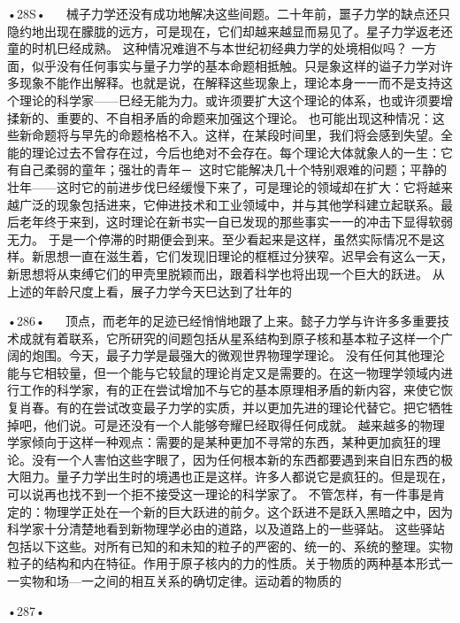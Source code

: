 •28S•
  
械子力学还没有成功地解决这些间题。二十年前，噩子力学的缺点还只隐约地出现在朦胧的远方，可是现在，它们却越来越显而易见了。星子力学返老还童的时机巳经成熟。
这种情况难逍不与本世纪初经典力学的处境相似吗？
一方面，似乎没有任何事实与量子力学的基本命题相抵触。只是象这样的谥子力学对许多现象不能作出解释。也就是说，在解释这些现象上，理论本身一一而不是支持这个理论的科学家——巳经无能为力。或许须要扩大这个理论的体系，也或许须要增揉新的、重要的、不自相矛盾的命题来加强这个理论。
也可能出现这种情况：这些新命题将与早先的命题格格不入。这样，在某段时间里，我们将会感到失望。全能的理论过去不曾存在过，今后也绝对不会存在。每个理论大体就象人的一生：它有自己柔弱的童年；强壮的青年－~这时它能解决几十个特别艰难的问题；平静的壮年——这时它的前进步伐巳经缓慢下来了，可是理论的领域却在扩大：它将越来越广泛的现象包括进来，它伸进技术和工业领域中，并与其他学科建立起联系。最后老年终于来到，这时理论在新书实一自已发现的那些事实一一的冲击下显得软弱无力。
于是一个停滞的时期便会到来。至少看起来是这样，虽然实际情况不是这样。新思想一直在滋生着，它们发现旧理论的框框过分狭窄。迟早会有这么一天，新思想将从束缚它们的甲壳里脱颖而出，跟着科学也将出现一个巨大的跃进。
从上述的年龄尺度上看，展子力学今天巳达到了壮年的

•286•
  
顶点，而老年的足迹已经悄悄地跟了上来。懿子力学与许许多多重要技术成就有着联系，它所研究的间题包括从星系结构到原子核和基本粒子这样一个广阔的炮围。今天，最子力学是最强大的微观世界物理学理论。
没有任何其他理沦能与它相较量，但一个能与它较鼠的理论肖定又是需要的。在这一物理学领域内进行工作的科学家，有的正在尝试增加不与它的基本原理相矛盾的新内容，来使它恢复肖春。有的在尝试改变最子力学的实质，并以更加先进的理论代替它。把它牺牲掉吧，他们说。可是还没有一个人能够夸耀巳经取得任何成就。
越来越多的物理学家倾向于这样一种观点：需要的是某种更加不寻常的东西，某种更加疯狂的理论。没有一个人害怕这些字眼了，因为任何根本新的东西都要遇到来自旧东西的极大阻力。量子力学出生时的境遇也正是这样。许多人都说它是疯狂的。但是现在，可以说再也找不到一个拒不接受这一理论的科学家了。
不管怎样，有一件事是肯定的：物理学正处在一个新的巨大跃进的前夕。这个跃进不是跃入黑暗之中，因为科学家十分清楚地看到新物理学必由的道路，以及道路上的一些驿站。
这些驿站包括以下这些。对所有已知的和未知的粒子的严密的、统一的、系统的整理。实物粒子的结构和内在特征。作用于原子核内的力的性质。关于物质的两种基本形式一一实物和场—一之间的相互关系的确切定律。运动着的物质的

•287•
  




